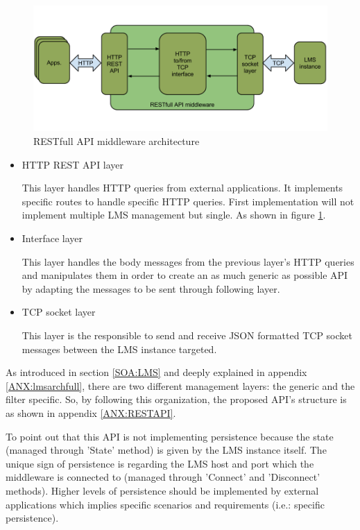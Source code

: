 \begin{figure}[!htb]
\begin{center}
\includegraphics[width=1\textwidth]{./images/RESTAPI.png}
\caption{RESTfull API middleware architecture}
\label{F:restAPI}
\end{center}
\end{figure}

\begin{itemize}
\item HTTP REST API layer \hfill

This layer handles HTTP queries from external applications. It implements specific routes to handle specific HTTP queries. First implementation will not implement multiple LMS management but single. As shown in figure \ref{F:restAPI}.

\item Interface layer \hfill

This layer handles the body messages from the previous layer's HTTP queries and manipulates them in order to create an as much generic as possible API by adapting the messages to be sent through following layer.

\item TCP socket layer \hfill

This layer is the responsible to send and receive JSON formatted TCP socket messages between the LMS instance targeted.
\end{itemize}

As introduced in section \ref{SOA:LMS} and deeply explained in appendix \ref{ANX:lmsarchfull}, there are two different management layers: the generic and the filter specific. So, by following this organization, the proposed API's structure is as shown in appendix \ref{ANX:RESTAPI}.

To point out that this API is not implementing persistence because the state (managed through 'State' method) is given by the LMS instance itself. The unique sign of persistence is regarding the LMS host and port which the middleware is connected to (managed through 'Connect' and 'Disconnect' methods). Higher levels of persistence should be implemented by external applications which implies specific scenarios and requirements (i.e.: specific persistence).

